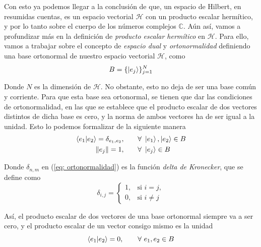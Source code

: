 \documentclass{article}
\numberwithin{equation}{section} %
\begin{document}
    Con esto ya podemos llegar a la conclusión de que, un espacio de Hilbert, en resumidas cuentas, es un espacio vectorial \( \mathcal{H} \) con un producto escalar hermítico, y por lo tanto sobre el cuerpo de los números complejos \( \mathbb{C} \). Aún así, vamos a profundizar más en la definición de \textit{producto escalar hermítico} en \( \mathcal{H} \). Para ello, vamos a trabajar sobre el concepto de \textit{espacio dual} y \textit{ortonormalidad} definiendo una base ortonormal de nuestro espacio vectorial \( \mathcal{H} \), como
    \begin{equation}
        B = \{ \ket{e_{j}} \} _{j = 1}^{N}
        \label{eq: base_ortonormal_H}
    \end{equation}

    \vspace{1.5mm}

    Donde \( N \) es la dimensión de \( \mathcal{H} \). No obstante, esto no deja de ser una base común y corriente. Para que esta base sea ortonormal, se tienen que dar las condiciones de ortonormalidad, en las que se establece que el producto escalar de dos vectores distintos de dicha base es cero, y la norma de ambos vectores ha de ser igual a la unidad. Esto lo podemos formalizar de la siguiente manera
    \begin{align}
        \braket{e_{1} | e_{2}} = \delta_{e_{1}, e_{2}}, \qquad &\forall \ \ket{e_{1}}, \ket{e_{2}} \in B \label{eq: ortonormalidad} \\
        \| e_{j} \| = 1,  \qquad &\forall \ \ket{e_{j}} \in B \label{eq: linealidad}
    \end{align}
    
    \vspace{1.5mm}

    Donde \( \delta_{n, m} \) en (\ref{eq: ortonormalidad}) es la función \textit{delta de Kronecker}, que se define como
    \begin{equation}
        \delta_{i, j} = 
        \begin{cases}
            1, & \text{si } i = j, \\
            0, & \text{si } i \neq j
        \end{cases}
        \label{eq:delta_kronecker}
    \end{equation}

    \vspace{1.5mm}

    Así, el producto escalar de dos vectores de una base ortonormal siempre va a ser cero, y el producto escalar de un vector consigo mismo es la unidad
    \begin{equation}
        \braket{e_{1} | e_{2}} = 0, \qquad \forall \ e_{1}, e_{2} \in B 
    \end{equation}
\end{document}
